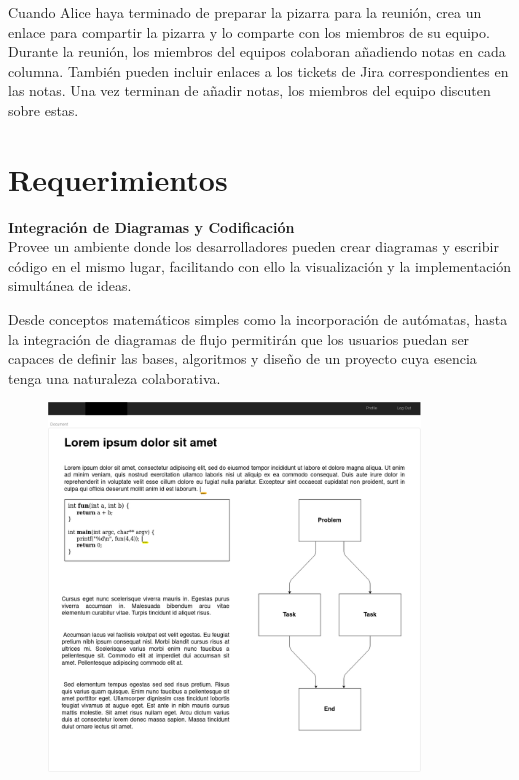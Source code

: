 \documentclass[a4paper, oneside, final]{scrartcl}
\begin{document}
Cuando Alice haya terminado de preparar la pizarra para la reunión, crea un enlace para compartir la pizarra y lo comparte con los miembros de su equipo. Durante la reunión, los miembros del equipos colaboran añadiendo notas en cada columna. También pueden incluir enlaces a los tickets de Jira correspondientes en las notas. Una vez terminan de añadir notas, los miembros del equipo discuten sobre estas.
\clearpage
\section{Requerimientos}

\textbf{\large Integración de Diagramas y Codificación}\\ %

  Provee un ambiente donde los desarrolladores pueden crear diagramas y escribir
  código en el mismo lugar, facilitando con ello la visualización y la
  implementación simultánea de ideas.

  Desde conceptos matemáticos simples como la incorporación de autómatas, hasta
  la integración de diagramas de flujo permitirán que los usuarios puedan ser
  capaces de definir las bases, algoritmos y diseño de un proyecto cuya esencia
  tenga una naturaleza colaborativa.

    \begin{figure}[h!]
    \centering
    \includegraphics[width=0.88\textwidth]{images/Interface01.png}
    \end{figure}
\end{document}
